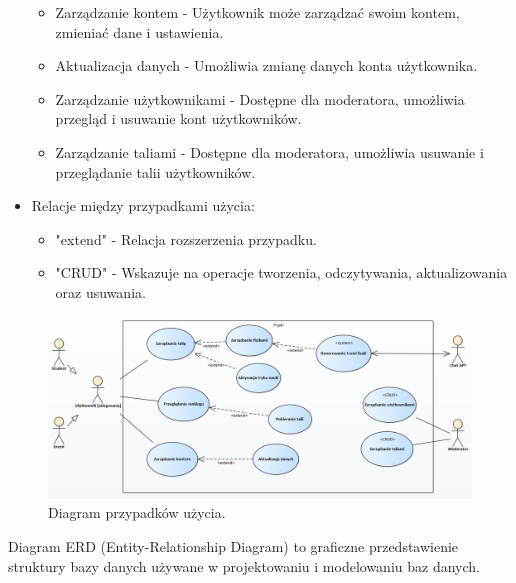 \begin{itemize}
\begin{itemize}
                                \item Zarządzanie kontem - Użytkownik może zarządzać swoim kontem, zmieniać dane i ustawienia.
                                \item Aktualizacja danych - Umożliwia zmianę danych konta użytkownika.
                                \item Zarządzanie użytkownikami - Dostępne dla moderatora, umożliwia przegląd i usuwanie kont użytkowników.
                                \item Zarządzanie taliami - Dostępne dla moderatora, umożliwia usuwanie i przeglądanie talii użytkowników.
    \end{itemize}
    \item Relacje między przypadkami użycia: \begin{itemize}
                                                 \item "extend" - Relacja rozszerzenia przypadku.
                                                 \item "CRUD" - Wskazuje na operacje tworzenia, odczytywania, aktualizowania oraz usuwania.
    \end{itemize}
\end{itemize}

\begin{figure}[H]
    \centering
    \includegraphics[width=1\textwidth]{chapters/chapter_6/diagram_przypadkow_uzycia}
    \caption{Diagram przypadków użycia.}
    \label{img:diagram_przypadkow_uzycia}
\end{figure}


\setlength{\parindent}{15pt}

\newpage

\indent Diagram ERD (Entity-Relationship Diagram) to graficzne przedstawienie struktury bazy danych używane w projektowaniu i modelowaniu baz danych.



